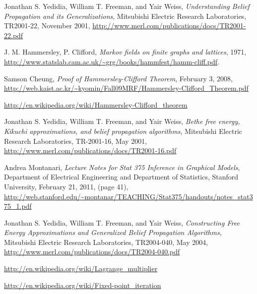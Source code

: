 \documentclass[fleqn,leqno]{article}
\begin{document}
\begin{thebibliography}{20}

  Jonathan S. Yedidia, William T. Freeman, and Yair Weiss,
  \emph{Understanding Belief Propagation and its Generalizations},
  Mitsubishi Electric Research Laboratories,
  TR2001-22, 
  November 2001,
  \url{http://www.merl.com/publications/docs/TR2001-22.pdf}

  J. M. Hammersley, P. Clifford,
  \emph{Markov fields on finite graphs and lattices},
  1971,
  \url{http://www.statslab.cam.ac.uk/~grg/books/hammfest/hamm-cliff.pdf}.

  Samson Cheung,
  \emph{Proof of Hammersley-Clifford Theorem},
  February 3, 2008,
  \url{http://web.kaist.ac.kr/~kyomin/Fall09MRF/Hammersley-Clifford_Theorem.pdf}

  \url{http://en.wikipedia.org/wiki/Hammersley-Clifford_theorem}
  
  Jonathan S. Yedidia, William T. Freeman, and Yair Weiss,
  \emph{Bethe free energy, Kikuchi approximations, and belief propagation algorithms},
  Mitsubishi Electric Research Laboratories,
  TR-2001-16,
  May 2001,
  \url{http://www.merl.com/publications/docs/TR2001-16.pdf}
  
  Andrea Montanari,
  \emph{Lecture Notes for Stat 375 Inference in Graphical Models},
  Department of Electrical Engineering and Department of Statistics, Stanford University,
  February 21, 2011,
  (page 41),
  \url{http://web.stanford.edu/~montanar/TEACHING/Stat375/handouts/notes_stat375_1.pdf}
  
  Jonathan S. Yedidia, William T. Freeman, and Yair Weiss,
  \emph{Constructing Free Energy Approximations and Generalized Belief Propagation Algorithms},
  Mitsubishi Electric Research Laboratories,
  TR2004-040,
  May 2004,
  \url{http://www.merl.com/publications/docs/TR2004-040.pdf}
  
  \url{http://en.wikipedia.org/wiki/Lagrange_multiplier}
  
  \url{http://en.wikipedia.org/wiki/Fixed-point_iteration}
  
\end{thebibliography}
\end{document}
